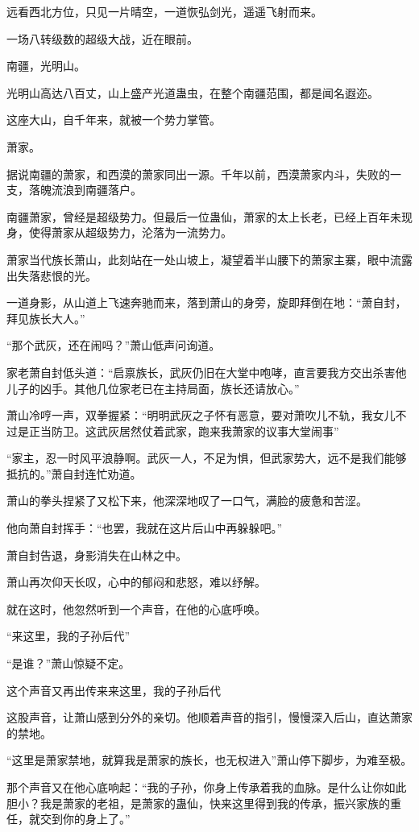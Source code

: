 \begin{this_body}
远看西北方位，只见一片晴空，一道恢弘剑光，遥遥飞射而来。

一场八转级数的超级大战，近在眼前。

南疆，光明山。

光明山高达八百丈，山上盛产光道蛊虫，在整个南疆范围，都是闻名遐迩。

这座大山，自千年来，就被一个势力掌管。

萧家。

据说南疆的萧家，和西漠的萧家同出一源。千年以前，西漠萧家内斗，失败的一支，落魄流浪到南疆落户。

南疆萧家，曾经是超级势力。但最后一位蛊仙，萧家的太上长老，已经上百年未现身，使得萧家从超级势力，沦落为一流势力。

萧家当代族长萧山，此刻站在一处山坡上，凝望着半山腰下的萧家主寨，眼中流露出失落悲恨的光。

一道身影，从山道上飞速奔驰而来，落到萧山的身旁，旋即拜倒在地：“萧自封，拜见族长大人。”

“那个武灰，还在闹吗？”萧山低声问询道。

家老萧自封低头道：“启禀族长，武灰仍旧在大堂中咆哮，直言要我方交出杀害他儿子的凶手。其他几位家老已在主持局面，族长还请放心。”

萧山冷哼一声，双拳握紧：“明明武灰之子怀有恶意，要对萧吹儿不轨，我女儿不过是正当防卫。这武灰居然仗着武家，跑来我萧家的议事大堂闹事”

“家主，忍一时风平浪静啊。武灰一人，不足为惧，但武家势大，远不是我们能够抵抗的。”萧自封连忙劝道。

萧山的拳头捏紧了又松下来，他深深地叹了一口气，满脸的疲惫和苦涩。

他向萧自封挥手：“也罢，我就在这片后山中再躲躲吧。”

萧自封告退，身影消失在山林之中。

萧山再次仰天长叹，心中的郁闷和悲怒，难以纾解。

就在这时，他忽然听到一个声音，在他的心底呼唤。

“来这里，我的子孙后代”

“是谁？”萧山惊疑不定。

这个声音又再出传来来这里，我的子孙后代

这股声音，让萧山感到分外的亲切。他顺着声音的指引，慢慢深入后山，直达萧家的禁地。

“这里是萧家禁地，就算我是萧家的族长，也无权进入”萧山停下脚步，为难至极。

那个声音又在他心底响起：“我的子孙，你身上传承着我的血脉。是什么让你如此胆小？我是萧家的老祖，是萧家的蛊仙，快来这里得到我的传承，振兴家族的重任，就交到你的身上了。”


\end{this_body}
